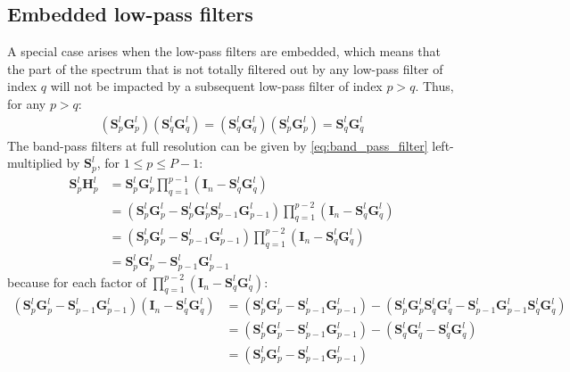 \documentclass[12pt]{scrartcl}
\begin{document}
\subsection{Embedded low-pass filters}
A special case arises when the low-pass filters are embedded, which means that the part of the spectrum that is not totally filtered out by any low-pass filter of index $q$ will not be impacted by a subsequent low-pass filter of index $p > q$. Thus, for any $p > q$:
\begin{align}
\left(\mathbf{S}^l_p \mathbf{G}^l_p\right) \left(\mathbf{S}^l_q \mathbf{G}^l_q\right) = \left(\mathbf{S}^l_q \mathbf{G}^l_q\right) \left(\mathbf{S}^l_p \mathbf{G}^l_p\right) = \mathbf{S}^l_q \mathbf{G}^l_q
\end{align}
The band-pass filters at full resolution can be given by \ref{eq:band_pass_filter} left-multiplied by $\mathbf{S}^l_p$, for $1 \le p \le P-1$:
\begin{align}
\mathbf{S}^l_p \mathbf{H}^l_p & = \mathbf{S}^l_p \mathbf{G}^l_p \prod_{q=1}^{p-1} \left(\mathbf{I}_n - \mathbf{S}^l_q \mathbf{G}^l_q\right) \nonumber \\
& = \left(\mathbf{S}^l_p \mathbf{G}^l_p - \mathbf{S}^l_p \mathbf{G}^l_p \mathbf{S}^l_{p-1} \mathbf{G}^l_{p-1}\right) \prod_{q=1}^{p-2} \left(\mathbf{I}_n - \mathbf{S}^l_q \mathbf{G}^l_q\right) \nonumber \\
& = \left(\mathbf{S}^l_p \mathbf{G}^l_p - \mathbf{S}^l_{p-1} \mathbf{G}^l_{p-1}\right) \prod_{q=1}^{p-2} \left(\mathbf{I}_n - \mathbf{S}^l_q \mathbf{G}^l_q\right) \nonumber \\
& = \mathbf{S}^l_p \mathbf{G}^l_p - \mathbf{S}^l_{p-1} \mathbf{G}^l_{p-1}
\end{align}
because for each factor of $\displaystyle \prod_{q=1}^{p-2} \left(\mathbf{I}_n - \mathbf{S}^l_q \mathbf{G}^l_q\right)$:
\begin{align}
\left(\mathbf{S}^l_p \mathbf{G}^l_p - \mathbf{S}^l_{p-1} \mathbf{G}^l_{p-1}\right) \left(\mathbf{I}_n - \mathbf{S}^l_q \mathbf{G}^l_q\right) & = \left(\mathbf{S}^l_p \mathbf{G}^l_p - \mathbf{S}^l_{p-1} \mathbf{G}^l_{p-1}\right) - \left(\mathbf{S}^l_p \mathbf{G}^l_p \mathbf{S}^l_q \mathbf{G}^l_q - \mathbf{S}^l_{p-1} \mathbf{G}^l_{p-1} \mathbf{S}^l_q \mathbf{G}^l_q \right) \nonumber \\
& = \left(\mathbf{S}^l_p \mathbf{G}^l_p - \mathbf{S}^l_{p-1} \mathbf{G}^l_{p-1}\right) - \left(\mathbf{S}^l_q \mathbf{G}^l_q - \mathbf{S}^l_q \mathbf{G}^l_q \right) \nonumber \\
& = \left(\mathbf{S}^l_p \mathbf{G}^l_p - \mathbf{S}^l_{p-1} \mathbf{G}^l_{p-1}\right)
\end{align}
\end{document}
